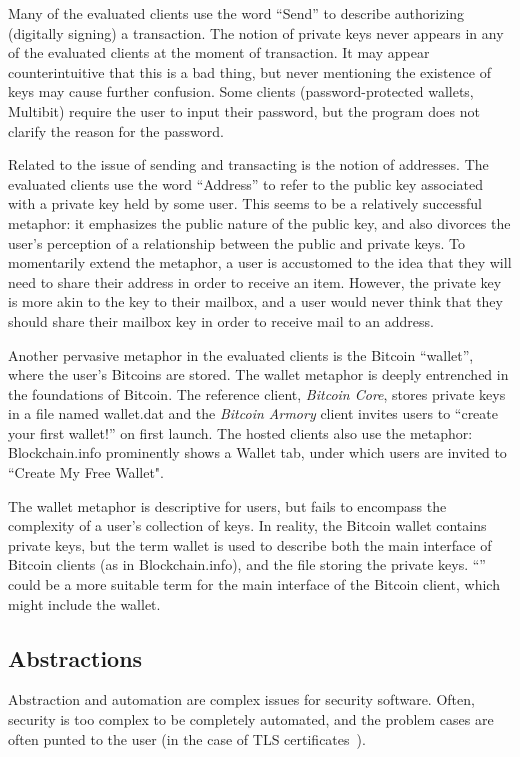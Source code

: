 Many of the evaluated clients use the word ``Send'' to describe authorizing (digitally signing) a transaction. The notion of private keys never appears in any of the evaluated clients at the moment of transaction. It may appear counterintuitive that this is a bad thing, but never mentioning the existence of keys may cause further confusion. Some clients (password-protected wallets, \eg Multibit) require the user to input their password, but the program does not clarify the reason for the password.

Related to the issue of sending and transacting is the notion of addresses. The evaluated clients use the word ``Address'' to refer to the public key associated with a private key held by some user. This seems to be a relatively successful metaphor: it emphasizes the public nature of the public key, and also divorces the user's perception of a relationship between the public and private keys. To momentarily extend the metaphor, a user is accustomed to the idea that they will need to share their address in order to receive an item. However, the private key is more akin to the key to their mailbox, and a user would never think that they should share their mailbox key in order to receive mail to an address. 

Another pervasive metaphor in the evaluated clients is the Bitcoin ``wallet'', where the user's Bitcoins are stored. The wallet metaphor is deeply entrenched in the foundations of Bitcoin. The reference client, \emph{Bitcoin Core}, stores private keys in a file named wallet.dat and the \emph{Bitcoin Armory} client invites users to ``create your first wallet!'' on first launch. The hosted clients also use the metaphor: Blockchain.info prominently shows a Wallet tab, under which users are invited to ``Create My Free Wallet". 

The wallet metaphor is descriptive for users, but fails to encompass the complexity of a user's collection of keys. In reality, the Bitcoin wallet contains private keys, but the term wallet is used to describe both the main interface of Bitcoin clients (as in Blockchain.info), and the file storing the private keys. ``'' could be a more suitable term for the main interface of the Bitcoin client, which might include the wallet.

\subsection{Abstractions}

Abstraction and automation are complex issues for security software. Often, security is too complex to be completely automated, and the problem cases are often punted to the user (\eg in the case of TLS certificates~\cite{Jenn Sobey work on browser}). 

